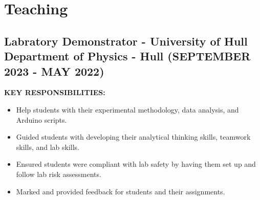 \documentclass{article}
\begin{document}
\section{Teaching}
\subsection{Labratory Demonstrator - \textnormal{University of Hull Department of Physics - Hull} \footnotesize{(SEPTEMBER 2023 - MAY 2022)}}
\begin{minipage}[t]{1\textwidth}
    \footnotesize{\textbf{KEY RESPONSIBILITIES:}}
    \normalsize{}
    \begin{itemize}[leftmargin=*]
        \item Help students with their experimental methodology, data analysis, and Arduino scripts. 
        \item Guided students with developing their analytical thinking skills, teamwork skills, and lab skills. 
        \item Ensured students were compliant with lab safety by having them set up and follow lab risk assessments. 
        \item Marked and provided feedback for students and their assignments.     
    \end{itemize}
\end{minipage}
\hfill
\end{document}
